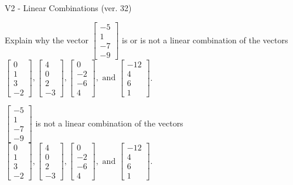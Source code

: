 \begin{exercise}
  \begin{exerciseTitle}V2 - Linear Combinations (ver. 32)\end{exerciseTitle}
  \begin{exerciseStatement}
    Explain why the vector \(\left[\begin{array}{c}
-5 \\
1 \\
-7 \\
-9
\end{array}\right]\)  is or is not a linear 
	combination of the vectors \(\left[\begin{array}{c}
0 \\
1 \\
3 \\
-2
\end{array}\right] , \left[\begin{array}{c}
4 \\
0 \\
2 \\
-3
\end{array}\right] , \left[\begin{array}{c}
0 \\
-2 \\
-6 \\
4
\end{array}\right] , \text{ and } \left[\begin{array}{c}
-12 \\
4 \\
6 \\
1
\end{array}\right]\).
	


  \end{exerciseStatement}
  \begin{exerciseAnswer}
   \(\left[\begin{array}{c}
-5 \\
1 \\
-7 \\
-9
\end{array}\right]\) 
  	 is not  
	a linear combination of the vectors \(\left[\begin{array}{c}
0 \\
1 \\
3 \\
-2
\end{array}\right] , \left[\begin{array}{c}
4 \\
0 \\
2 \\
-3
\end{array}\right] , \left[\begin{array}{c}
0 \\
-2 \\
-6 \\
4
\end{array}\right] , \text{ and } \left[\begin{array}{c}
-12 \\
4 \\
6 \\
1
\end{array}\right]\).


\end{exerciseAnswer}
\end{exercise}
